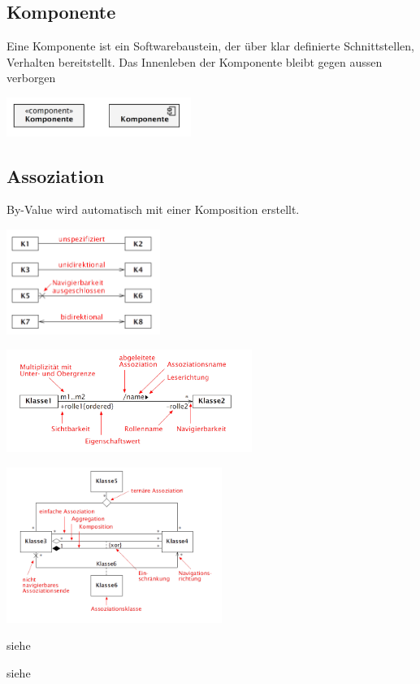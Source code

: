 \subsection{Komponente }
  \begin{minipage}{12cm}
    Eine Komponente ist ein Softwarebaustein, der über klar definierte Schnittstellen, Verhalten bereitstellt.
    Das Innenleben der Komponente bleibt gegen aussen verborgen
  \end{minipage}
  \begin{minipage}{6cm}
    \includegraphics[width=6cm]{./bilder/Komponente.png}
  \end{minipage}
  

\subsection{Assoziation }
  By-Value wird automatisch mit einer Komposition erstellt.
  \begin{description}[leftmargin=3.5cm]
    \item[Navigierbarkeit]
      \parbox{5cm}{\includegraphics[width=5cm]{./bilder/Navigierbarkeit.png}}
    \item[Notation]
      \parbox{8cm}{\includegraphics[width=8cm]{./bilder/Notation_Assozi_1.png}}
      \parbox{7cm}{\includegraphics[width=7cm]{./bilder/Notation_Assozi_2.png}}
    \item[Eigenschaftswerte]
      siehe 
    \item[Implementation]
      siehe 
  \end{description}

